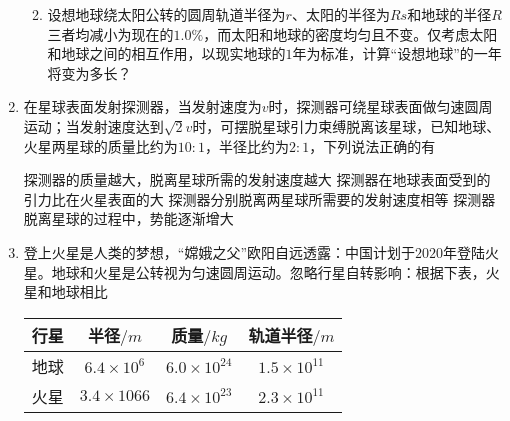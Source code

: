 \begin{enumerate}[leftmargin=0em]
\begin{enumerate}
\begin{enumerate}
\end{enumerate}


\item 
设想地球绕太阳公转的圆周轨道半径为$ r $、太阳的半径为$ Rs $和地球的半径$ R $三者均减小为现在的$ 1.0 \% $，而太阳和地球的密度均匀且不变。仅考虑太阳和地球之间的相互作用，以现实地球的$ 1 $年为标准，计算“设想地球”的一年将变为多长？



\end{enumerate}





\item 
{}
在星球表面发射探测器，当发射速度为$ v $时，探测器可绕星球表面做匀速圆周运动；当发射速度达到$ \sqrt{2} v $时，可摆脱星球引力束缚脱离该星球，已知地球、火星两星球的质量比约为$ 10 : 1 $，半径比约为$ 2 : 1 $，下列说法正确的有  

\fourchoices
{探测器的质量越大，脱离星球所需的发射速度越大}
{探测器在地球表面受到的引力比在火星表面的大}
{探测器分别脱离两星球所需要的发射速度相等}
{探测器脱离星球的过程中，势能逐渐增大}

\newpage
\item 
{}
登上火星是人类的梦想，“嫦娥之父”欧阳自远透露：中国计划于$ 2020 $年登陆火星。地球和火星是公转视为匀速圆周运动。忽略行星自转影响：根据下表，火星和地球相比  
\begin{table}[h!]
\centering 
\begin{tabular}{|c|c|c|c|}
\hline 
行星 & 半径$ /m $ & 质量$ /kg $ & 轨道半径$ /m $
 \\
\hline
地球 & $ 6.4 \times 10^6 $ & $ 6.0 \times 10^{24} $ & $ 1.5 \times 10^{11} $
 \\
\hline
火星 & $ 3.4 \times 1066 $ & $ 6.4 \times 10^{23} $ & $ 2.3 \times 10^{11} $\\ 
\hline 
\end{tabular}
\end{table} 


\end{enumerate}
